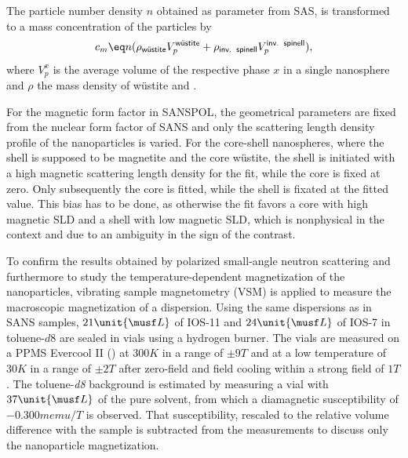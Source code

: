 \documentclass[\main/dresen_thesis.tex]{subfiles}
\begin{document}
    The particle number density $n$ obtained as parameter from SAS, is transformed to a mass concentration of the particles by
    \begin{align}
      c_m \eq n (\rho_\textsf{w\"ustite} V_p^\textsf{w\"ustite} + \rho_\textsf{inv.\, spinell} V_p^\textsf{inv.\, spinell}),
    \end{align}
    where $V^x_p$ is the average volume of the respective phase $x$ in a single nanosphere and $\rho$ the mass density of w\"ustite and .

    For the magnetic form factor in SANSPOL, the geometrical parameters are fixed from the nuclear form factor of SANS and only the scattering length density profile of the nanoparticles is varied.
    For the core-shell nanospheres, where the shell is supposed to be magnetite and the core w\"ustite, the shell is initiated with a high magnetic scattering length density for the fit, while the core is fixed at zero.
    Only subsequently the core is fitted, while the shell is fixated at the fitted value.
    This bias has to be done, as otherwise the fit favors a core with high magnetic SLD and a shell with low magnetic SLD, which is nonphysical in the context and due to an ambiguity in the sign of the contrast.

    To confirm the results obtained by polarized small-angle neutron scattering and furthermore to study the temperature-dependent magnetization of the nanoparticles, vibrating sample magnetometry (VSM) is applied to measure the macroscopic magnetization of a dispersion.
    Using the same dispersions as in SANS samples, $21 \unit{\musf L}$ of IOS-11 and $24 \unit{\musf L}$ of IOS-7 in toluene-$\mathit{d8}$ are sealed in vials using a hydrogen burner.
    The vials are measured on a PPMS Evercool II () at $300 \unit{K}$ in a range of $\pm 9 \unit{T}$ and at a low temperature of $30 \unit{K}$ in a range of $\pm 2 \unit{T}$ after zero-field and field cooling within a strong field of $1 \unit{T}$.
    The toluene-\textit{d8} background is estimated by measuring a vial with $37 \unit{\musf L}$ of the pure solvent, from which a diamagnetic susceptibility of $-0.300 \unit{memu/T}$ is observed.
    That susceptibility, rescaled to the relative volume difference with the sample is subtracted from the measurements to discuss only the nanoparticle magnetization.
\end{document}
